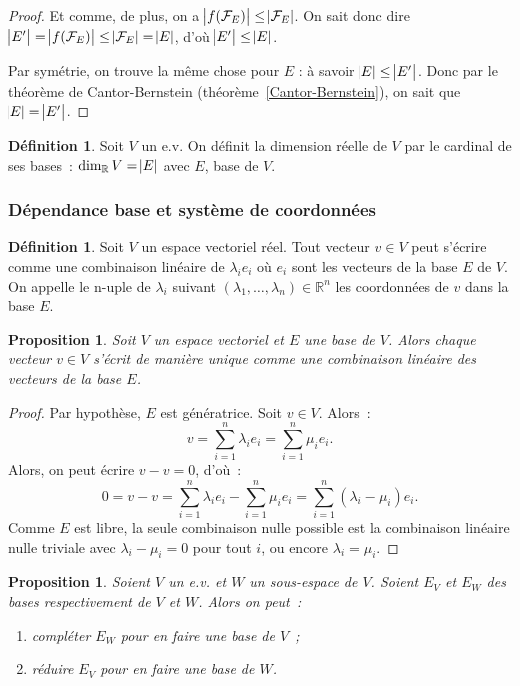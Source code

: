 \documentclass{article}
\newcommand{\R}{\mathbb R}
\newtheorem{prp}[thm]{Proposition}
\theoremstyle{definition}
\newtheorem{déf}[thm]{Définition}
\theoremstyle{remark}
\begin{document}
\begin{proof}
		Et comme, de plus, on a $\abs {f(\mathcal F_E)} \leq \abs {\mathcal F_E}$. On sait donc dire
		$\abs {E'} = \abs {f(\mathcal F_E)} \leq \abs {\mathcal F_E} = \abs E$, d'où $\abs {E'} \leq \abs E$.

		Par symétrie, on trouve la même chose pour $E$ : à savoir $\abs E \leq \abs {E'}$. Donc par le théorème de Cantor-Bernstein (théorème~\ref{Cantor-Bernstein}), on
		sait que $\abs E = \abs {E'}$. \end{proof}

		\begin{déf} Soit $V$ un e.v. On définit la dimension réelle de $V$ par le cardinal de ses bases~: $\dim_\R V = \abs E$ avec $E$, base de $V$. \end{déf}
	
		\subsubsection{Dépendance base et système de coordonnées}
		\begin{déf} Soit $V$ un espace vectoriel réel. Tout vecteur $v \in V$ peut s'écrire comme une combinaison linéaire de $\lambda_ie_i$ où $e_i$ sont les vecteurs
		de la base $E$ de $V$. On appelle le n-uple de $\lambda_i$ suivant $(\lambda_1, \dotsc, \lambda_n) \in \R^n$ les coordonnées de $v$ dans la base $E$. \end{déf}

		\begin{prp} Soit $V$ un espace vectoriel et $E$ une base de $V$. Alors chaque vecteur $v \in V$ s'écrit de manière unique comme une combinaison linéaire des
		vecteurs de la base $E$. \end{prp}

		\begin{proof} Par hypothèse, $E$ est génératrice. Soit $v \in V$. Alors~: \[v = \sum_{i=1}^n\lambda_ie_i = \sum_{i=1}^n\mu_ie_i.\] Alors, on peut écrire
		$v-v = 0$, d'où~: \[0 = v - v = \sum_{i=1}^n\lambda_ie_i - \sum_{i=1}^n\mu_ie_i = \sum_{i=1}^n(\lambda_i - \mu_i)e_i.\] Comme $E$ est libre, la seule combinaison
		nulle possible est la combinaison linéaire nulle triviale avec $\lambda_i-\mu_i=0$ pour tout $i$, ou encore $\lambda_i = \mu_i$. \end{proof}

		\begin{prp}\label{inclusionBases} Soient $V$ un e.v. et $W$ un sous-espace de $V$. Soient $E_V$ et $E_W$ des bases respectivement de $V$ et $W$. Alors on peut~:
		\begin{enumerate}
			\item compléter $E_W$ pour en faire une base de $V$~;
			\item réduire $E_V$ pour en faire une base de $W$.
		\end{enumerate}
		\end{prp}
\end{document}
